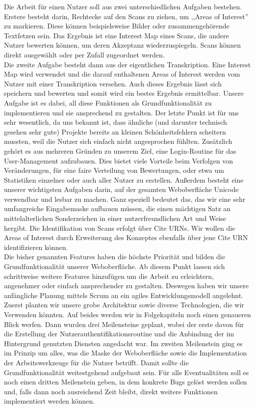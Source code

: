 \documentclass{article}
\begin{document}
Die Arbeit für einen Nutzer soll aus zwei unterschiedlichen Aufgaben bestehen. Erstere besteht darin, Rechtecke auf den Scans zu ziehen, um ,,Areas of Interest'' zu markieren. Diese können beispielsweise Bilder oder zusammengehörende Textfetzen sein. Das Ergebnis ist eine Interest Map eines Scans, die andere Nutzer bewerten können, um deren Akzeptanz wiederzuspiegeln. Scans können direkt ausgewählt oder per Zufall zugeordnet werden. \\
Die zweite Aufgabe besteht dann aus der eigentlichen Transkription. Eine Interest Map wird verwendet und die darauf enthaltenen Areas of Interest werden vom Nutzer mit einer Transkription versehen. Auch dieses Ergebnis lässt sich speichern und bewerten und somit wird ein bestes Ergebnis ermittelbar. Unsere Aufgabe ist es dabei, all diese Funktionen als Grundfunktionalität zu implementieren und sie ansprechend zu gestalten. Der letzte Punkt ist für uns sehr wesentlich, da uns bekannt ist, dass ähnliche (und darunter technisch gesehen sehr gute) Projekte bereits an kleinen Schönheitsfehlern scheitern mussten, weil die Nutzer sich einfach nicht angesprochen fühlten. Zusätzlich gehört es aus mehreren Gründen zu unserem Ziel, eine Login-Routine für das User-Management aufzubauen. Dies bietet viele Vorteile beim Verfolgen von Veränderungen, für eine faire Verteilung von Bewertungen, oder etwa um Statistiken einzelner oder auch aller Nutzer zu erstellen. Außerdem besteht eine unserer wichtigsten Aufgaben darin, auf der gesamten Weboberfläche Unicode verwendbar und lesbar zu machen. Ganz speziell bedeutet das, das wir eine sehr umfangreiche Eingabemaske aufbauen müssen, die einen mächtigen Satz an mittelalterlichen Sonderzeichen in einer nutzerfreundlichen Art und Weise hergibt. Die Identifikation von Scans erfolgt über Cite URNs. Wir wollen die Areas of Interest durch Erweiterung des Konzeptes ebenfalls über jene Cite URN identifizieren können. \\ %
Die bisher genannten Features haben die höchste Priorität und bilden die Grundfunktionalität unserer Weboberfläche. Ab diesem Punkt lassen sich schrittweise weitere Features hinzufügen um die Arbeit zu erleichtern, angenehmer oder einfach ansprechender zu gestalten. Deswegen haben wir unsere anfängliche Planung mittels Scrum an ein agiles Entwicklungsmodell angelehnt. Zuerst planten wir unsere grobe Architektur sowie diverse Technologien, die wir Verwenden könnten. Auf beides werden wir in Folgekapiteln noch einen genaueren Blick werfen. Dann wurden drei Meilensteine geplant, wobei der erste davon für die Erstellung der Nutzerauthentifikationsroutine und die Anbindung der im Hintergrund genutzten Diensten angedacht war. Im zweiten Meilenstein ging es im Prinzip um alles, was die Maske der Weboberfläche sowie die Implementation der Arbeitswerkzeuge für die Nutzer betrifft. Damit sollte die Grundfunktionalität weitestgehend aufgebaut sein. Für alle Eventualitäten soll es noch einen dritten Meilenstein geben, in dem konkrete Bugs gelöst werden sollen und, falls dann noch ausreichend Zeit bleibt, direkt weitere Funktionen implementiert werden können.
\end{document}
